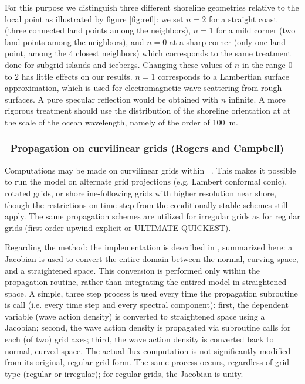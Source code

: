 For this purpose we distinguish three different shoreline geometries relative to the local point as illustrated by 
figure \ref{fig:refl}: we set  $n=2$ for a straight coast (three connected land points 
among the neighbors), $n=1$ for a mild corner (two land points 
among the neighbors), and $n=0$ at a sharp corner (only one land point, among the 4 closest neighbors) which corresponds to the 
same treatment done for subgrid islands and icebergs. Changing these values of $n$ in the range $0$ to $2$  has little effects on our results. 
$n=1$ corresponds to a Lambertian surface approximation, which is used for electromagnetic wave scattering from rough surfaces. A pure 
specular reflection would be obtained with $n$ infinite. 
A more rigorous 
treatment should use the distribution of the shoreline orientation at at the scale of the ocean wavelength, namely of the order of 100~m. 

\vsssub
\subsubsection{~Propagation on curvilinear grids \hfill {\rm (Rogers and Campbell)}} \label{sec_irreg}
\vsssub

Computations may be made on curvilinear grids within \ws\ . This makes it possible to run the model on alternate grid projections 
(e.g. Lambert conformal conic), rotated grids, or shoreline-following grids with higher resolution near shore, though the 
restrictions on time step from the conditionally stable schemes still apply. The same propagation schemes are utilized for 
irregular grids as for regular grids (first order upwind explicit or ULTIMATE QUICKEST).

Regarding the method: the implementation is described in \citep{RogCamp:NRLrep09}, summarized here: a Jacobian is used to convert 
the entire domain between the normal, curving space, and a straightened space. This conversion is performed only within the 
propagation routine, rather than integrating the entired model in straightened space. A simple, three step process is used every 
time the propagation subroutine is call (i.e. every time step and every spectral component): first, the dependent variable 
(wave action density) is converted to straightened space using a Jacobian; second, the wave action density is propagated via 
subroutine calls for each (of two) grid axes; third, the wave action density is converted back to normal, curved space. The actual 
flux computation is not significantly modified from its original, regular grid form. The same process occurs, regardless of grid 
type (regular or irregular); for regular grids, the Jacobian is unity.

